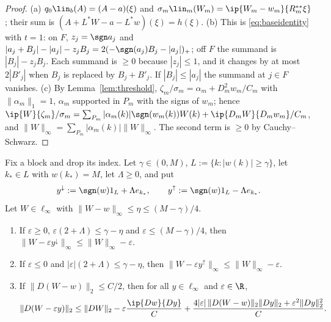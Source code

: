 \begin{proof}
(a) $q_0\lin_b(A)=(A-a)(\xi)$ and $\sigma_m\lin_m(W_m)=\ip{W_m-w_m}
{R_m^{**}\xi}$; their sum is $(A+L^*W-a-L^*w)(\xi)=h(\xi)$.
(b) This is \eqref{eq:baseidentity} with $t=1$: on $F$, $z_j=\sgn a_j$ and
$|a_j+B_j|-|a_j|-z_jB_j=2(-\sgn(a_j)B_j-|a_j|)_+$; off $F$ the summand is
$|B_j|-z_jB_j$.  Each summand is $\ge0$ because $|z_j|\le1$, and it changes
by at most $2|B'_j|$ when $B_j$ is replaced by $B_j+B'_j$.  If $|B_j|\le|a_j|$
the summand at $j\in F$ vanishes.
(c) By Lemma~\ref{lem:threshold}, $\zeta_m/\sigma_m=\alpha_m+D_m^2w_m/C_m$
with $\|\alpha_m\|_1=1$, $\alpha_m$ supported in $P_m$ with the signs of
$w_m$; hence $\ip{W}{\zeta_m}/\sigma_m=\sum_{P_m}|\alpha_m(k)|\sgn(w_m(k))
W(k)+\ip{D_mW}{D_mw_m}/C_m$, and $\|W\|_\infty=\sum_{P_m}|\alpha_m(k)|
\|W\|_\infty$.  The second term is $\ge0$ by Cauchy--Schwarz.
\end{proof}

\begin{lemma}\label{lem:TV}
Fix a block and drop its index.  Let $\gamma\in(0,M)$,
$L:=\{k:|w(k)|\ge\gamma\}$, let $k_*\in L$ with $w(k_*)=M$, let
$\Lambda\ge0$, and put
\[
 y^{\downarrow}:=\sgn(w)1_L+\Lambda e_{k_*},\qquad
 y^{\uparrow}:=\sgn(w)1_L-\Lambda e_{k_*}.
\]
Let $W\in\ell_\infty$ with $\|W-w\|_\infty\le\eta\le(M-\gamma)/4$.
\begin{enumerate}
\item[(a)] If $\varepsilon\ge0$, $\varepsilon(2+\Lambda)\le\gamma-\eta$ and
$\varepsilon\le(M-\gamma)/4$, then $\|W-\varepsilon y^\downarrow\|_\infty
\le\|W\|_\infty-\varepsilon$.
\item[(b)] If $\varepsilon\le0$ and $|\varepsilon|(2+\Lambda)\le\gamma-\eta$,
then $\|W-\varepsilon y^\uparrow\|_\infty\le\|W\|_\infty-\varepsilon$.
\item[(c)] If $\|D(W-w)\|_2\le C/2$, then for all $y\in\ell_\infty$ and
$\varepsilon\in\R$,
\[
 \|D(W-\varepsilon y)\|_2\le\|DW\|_2-\varepsilon\frac{\ip{Dw}{Dy}}C
 +\frac{4|\varepsilon|\,\|D(W-w)\|_2\|Dy\|_2+\varepsilon^2\|Dy\|_2^2}{C}.
\]
\end{enumerate}
\end{lemma}

